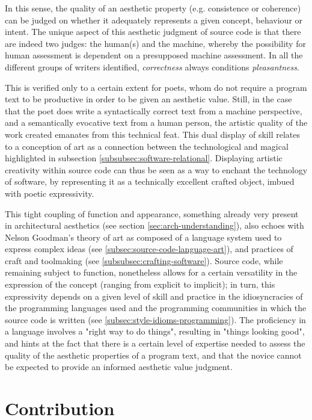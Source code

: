In this sense, the quality of an aesthetic property (e.g. consistence or coherence) can be judged on whether it adequately represents a given concept, behaviour or intent. The unique aspect of this aesthetic judgment of source code is that there are indeed two judges: the human(s) and the machine, whereby the possibility for human assessment is dependent on a presupposed machine assessment. In all the different groups of writers identified, \emph{correctness} always conditions \emph{pleasantness}.

This is verified only to a certain extent for poets, whom do not require a program text to be productive in order to be given an aesthetic value. Still, in the case that the poet does write a syntactically correct text from a machine perspective, and a semantically evocative text from a human person, the artistic quality of the work created emanates from this technical feat. This dual display of skill relates to a conception of art as a connection between the technological and magical highlighted in subsection \ref{subsubsec:software-relational}. Displaying artistic creativity within source code can thus be seen as a way to enchant the technology of software, by representing it as a technically excellent crafted object, imbued with poetic expressivity.

This tight coupling of function and appearance, something already very present in architectural aesthetics (see section \ref{sec:arch-understanding}), also echoes with Nelson Goodman's theory of art as composed of a language system used to express complex ideas (see \ref{subsec:source-code-language-art}), and practices of craft and toolmaking (see \ref{subsubsec:crafting-software}). Source code, while remaining subject to function, nonetheless allows for a certain versatility in the expression of the concept (ranging from explicit to implicit); in turn, this expressivity depends on a given level of skill and practice in the idiosyncracies of the programming languages used and the programming communities in which the source code is written (see \ref{subsec:style-idioms-programming}). The proficiency in a language involves a "right way to do things", resulting in "things looking good", and hints at the fact that there is a certain level of expertise needed to assess the quality of the aesthetic properties of a program text, and that the novice cannot be expected to provide an informed aesthetic value judgment.

\section{Contribution}
\label{sec:conclusion-contribution}

